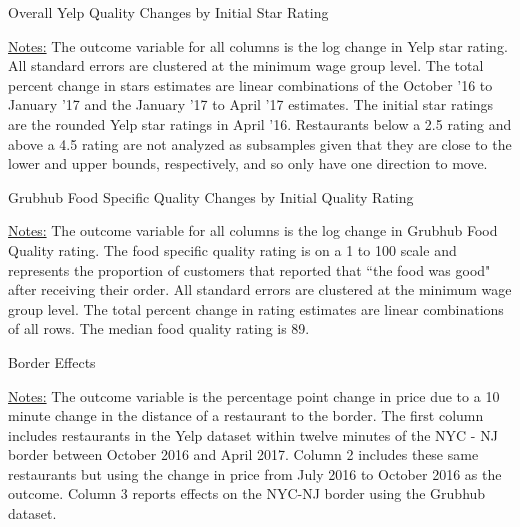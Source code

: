 \documentclass[11pt]{article}
\begin{document}
\newpage 

\vspace*{\fill}
\begin{table}[H]
\centering
\caption{Overall Yelp Quality Changes by Initial Star Rating}

{\footnotesize \raggedright \underline{Notes:} 
The outcome variable for all columns is the log change in Yelp star rating. All standard errors are clustered at the minimum wage group level. The total percent change in stars estimates are linear combinations of the October '16 to January '17 and the January '17 to April '17 estimates. The initial star ratings are the rounded Yelp star ratings in April '16. Restaurants below a 2.5 rating and above a 4.5 rating are not analyzed as subsamples given that they are close to the lower and upper bounds, respectively, and so only have one direction to move. \par
}
\end{table}
\vspace*{\fill}

\newpage 

\vspace*{\fill}

\begin{table}[H]\caption{Grubhub Food Specific Quality Changes by Initial Quality Rating}

{\footnotesize \raggedright \underline{Notes:} 
The outcome variable for all columns is the log change in Grubhub Food Quality rating. The food specific quality rating is on a 1 to 100 scale and represents the proportion of customers that reported that ``the food was good" after receiving their order. All standard errors are clustered at the minimum wage group level. The total percent change in rating estimates are linear combinations of all rows. The median food quality rating is 89. \par
}
\end{table}

\vspace*{\fill}


\vspace*{\fill}


\newpage 

\vspace*{\fill}
\begin{table}[H]
\centering
\caption{Border Effects}

{\footnotesize \raggedright \underline{Notes:} 
The outcome variable is the percentage point change in price due to a 10 minute change in the distance of a restaurant to the border. The first column includes restaurants in the Yelp dataset within twelve minutes of the NYC - NJ border between October 2016 and April 2017. Column 2 includes these same restaurants but using the change in price from July 2016 to October 2016 as the outcome. Column 3 reports effects on the NYC-NJ border using the Grubhub dataset. \par
}
\end{table}
\vspace*{\fill}
\end{document}
